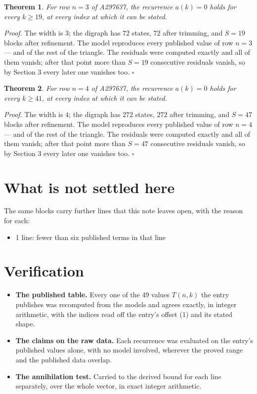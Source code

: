 \documentclass[11pt]{article}
\newtheorem{theorem}{Theorem}
\theoremstyle{definition}
\begin{document}
\begin{theorem} For row $n = 3$ of A297637, the recurrence $a(k) = 0$ holds for every $k \ge 19$, at every index at which it can be stated.\end{theorem}

{\itshape Proof.} The width is $3$; the digraph has $72$ states, $72$ after trimming, and $S = 19$ blocks after refinement. The model reproduces every published value of row $n = 3$ --- and of the rest of the triangle. The residuals were computed exactly and all of them vanish; after that point more than $S = 19$ consecutive residuals vanish, so by Section 3 every later one vanishes too. $\square$

\begin{theorem} For row $n = 4$ of A297637, the recurrence $a(k) = 0$ holds for every $k \ge 41$, at every index at which it can be stated.\end{theorem}

{\itshape Proof.} The width is $4$; the digraph has $272$ states, $272$ after trimming, and $S = 47$ blocks after refinement. The model reproduces every published value of row $n = 4$ --- and of the rest of the triangle. The residuals were computed exactly and all of them vanish; after that point more than $S = 47$ consecutive residuals vanish, so by Section 3 every later one vanishes too. $\square$

\section{What is not settled here}

The same blocks carry further lines that this note leaves open, with the reason for each:

\begin{itemize}

\item 1 line: fewer than six published terms in that line

\end{itemize}

\section{Verification}

\begin{itemize}

\item {\bfseries The published table.} Every one of the 49 values $T(n,k)$ the entry publishes was recomputed from the models and agrees exactly, in integer arithmetic, with the indices read off the entry's offset (1) and its stated shape.

\item {\bfseries The claims on the raw data.} Each recurrence was evaluated on the entry's published values alone, with no model involved, wherever the proved range and the published data overlap.

\item {\bfseries The annihilation test.} Carried to the derived bound for each line separately, over the whole vector, in exact integer arithmetic.

\end{itemize}
\end{document}
